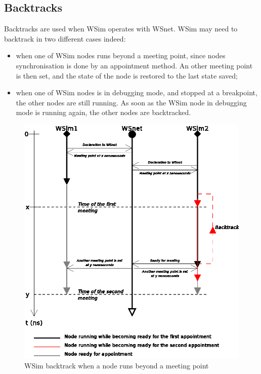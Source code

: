 \documentclass[a4paper,10pt]{report}
\begin{document}
\subsection{Backtracks}
Backtracks are used when WSim operates with WSnet. WSim may need to backtrack in two different cases indeed:
\begin{itemize}
  \item when one of WSim nodes runs beyond a meeting point, since nodes synchronisation is done by an appointment method. An other meeting point is then set, and the state of the node is restored to the last state saved;
  \item when one of WSim nodes is in debugging mode, and stopped at a breakpoint, the other nodes are still running. As soon as the WSim node in debugging mode is running again, the other nodes are backtracked.
\end{itemize}

\begin{figure}
\begin{center}
  \includegraphics[scale=1]{figures/wsim_backtrack1.eps}
\end{center}
\caption{WSim backtrack when a node runs beyond a meeting point}
\label{wsim backtrack 1}
\end{figure}
\end{document}
